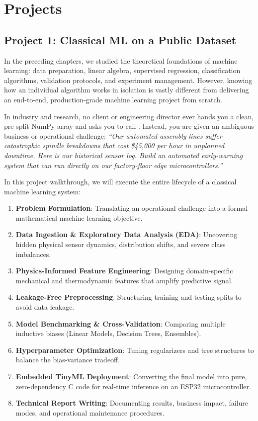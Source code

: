 \chapter{Projects}\label{ch:projects}
\section{Project 1: Classical ML on a Public Dataset}\label{sec:project1_classical}

In the preceding chapters, we studied the theoretical foundations of machine learning: data preparation, linear algebra, supervised regression, classification algorithms, validation protocols, and experiment management. However, knowing how an individual algorithm works in isolation is vastly different from delivering an end-to-end, production-grade machine learning project from scratch.

In industry and research, no client or engineering director ever hands you a clean, pre-split NumPy array and asks you to call . Instead, you are given an ambiguous business or operational challenge: \textit{``Our automated assembly lines suffer catastrophic spindle breakdowns that cost \$45,000 per hour in unplanned downtime. Here is our historical sensor log. Build an automated early-warning system that can run directly on our factory-floor edge microcontrollers.''}

In this project walkthrough, we will execute the entire lifecycle of a classical machine learning system:
\begin{enumerate}
    \item \textbf{Problem Formulation}: Translating an operational challenge into a formal mathematical machine learning objective.
    \item \textbf{Data Ingestion \& Exploratory Data Analysis (EDA)}: Uncovering hidden physical sensor dynamics, distribution shifts, and severe class imbalances.
    \item \textbf{Physics-Informed Feature Engineering}: Designing domain-specific mechanical and thermodynamic features that amplify predictive signal.
    \item \textbf{Leakage-Free Preprocessing}: Structuring training and testing splits to avoid data leakage.
    \item \textbf{Model Benchmarking \& Cross-Validation}: Comparing multiple inductive biases (Linear Models, Decision Trees, Ensembles).
    \item \textbf{Hyperparameter Optimization}: Tuning regularizers and tree structures to balance the bias-variance tradeoff.
    \item \textbf{Embedded TinyML Deployment}: Converting the final model into pure, zero-dependency C code for real-time inference on an ESP32 microcontroller.
    \item \textbf{Technical Report Writing}: Documenting results, business impact, failure modes, and operational maintenance procedures.
\end{enumerate}

